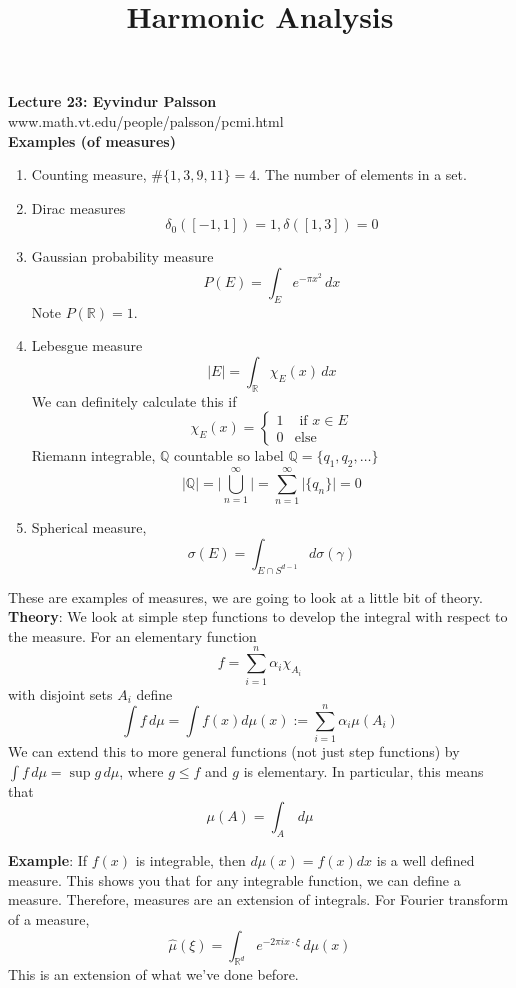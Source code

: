 \documentclass[12pt]{article}
\title{Harmonic Analysis}
\begin{document}
\noindent \textbf{Lecture 23: Eyvindur Palsson} \\
\noindent www.math.vt.edu/people/palsson/pcmi.html \\

\noindent \textbf{Examples (of measures)} \\
\begin{enumerate}
\item Counting measure, $\#\{1, 3, 9 ,11\} = 4$. The number of elements in a set.
\item Dirac measures
$$\delta_0([-1,1])=1, \delta([1,3])=0$$
\item Gaussian probability measure
$$P(E)=\int_E e^{-\pi x^2} \, dx$$
Note $P(\mathbb{R})=1$. 
\item Lebesgue measure
$$\vert E \vert = \int_{\mathbb{R}} \chi_E(x) \,dx$$
We can definitely calculate this if 
$$\chi_E(x) = \begin{cases} 1 & \text{ if } x\in E \\ 0 & \text{else} \end{cases}$$
Riemann integrable, $\mathbb{Q}$ countable so label $\mathbb{Q}=\{q_1, q_2, \dots\}$
$$\vert \mathbb{Q} \vert = \vert \bigcup^\infty_{n=1}\vert = \sum^\infty_{n=1} \vert \{q_n\} \vert = 0$$
\item Spherical measure, 
$$\sigma(E) = \int_{E\cap S^{d-1}} d\sigma(\gamma)$$
\end{enumerate}
These are examples of measures, we are going to look at a little bit of theory. \\

\noindent \textbf{Theory}: We look at simple step functions to develop the integral with respect to the measure.
\noindent For an elementary function
$$f= \sum_{i=1}^n \alpha_i \chi_{A_i}$$
with disjoint sets $A_i$ define 
$$\int f \, d\mu  = \int f(x) d\mu(x) := \sum^n_{i=1} \alpha_i \mu(A_i)$$
We can extend this to more general functions (not just step functions) by 
$\int f \, d\mu = \sup g \, d\mu$, where $g \leq f$ and $g$ is elementary. In particular, this means that
$$\mu(A)= \int_A \, d\mu$$

\noindent \textbf{Example}: If $f(x)$ is integrable, then $d\mu(x) = f(x)dx$ is a well defined measure. This shows you that for any integrable function, we can define a measure. Therefore, measures are an extension of integrals. For Fourier transform of a measure, 
$$\hat{\mu}(\xi) = \int_{\mathbb{R}^d} e^{-2\pi i x \cdot \xi} \, d\mu(x)$$
This is an extension of what we've done before. \\
\end{document}
